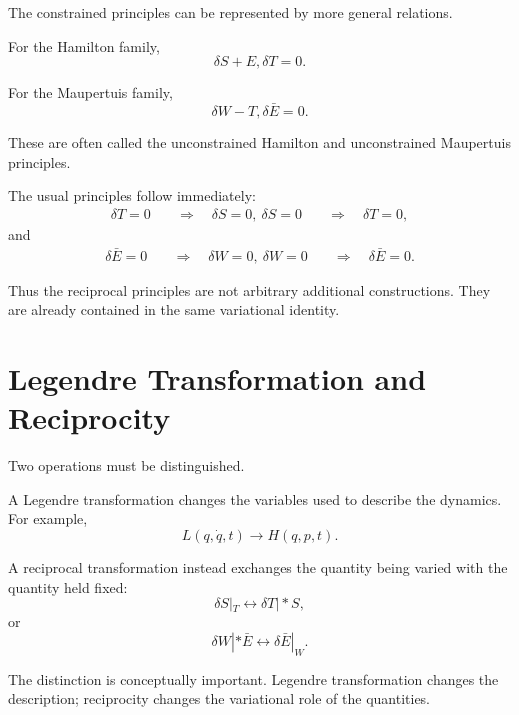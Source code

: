 The constrained principles can be represented by more general relations.

For the Hamilton family,
\begin{equation}
\boxed{
\delta S+E,\delta T=0.
}
\label{eq:UHP}
\end{equation}

For the Maupertuis family,
\begin{equation}
\boxed{
\delta W-T,\delta\bar E=0.
}
\label{eq:UMP}
\end{equation}

These are often called the unconstrained Hamilton and unconstrained Maupertuis principles.

The usual principles follow immediately:
\begin{align}
\delta T=0
&\quad\Rightarrow\quad
\delta S=0,
\
\delta S=0
&\quad\Rightarrow\quad
\delta T=0,
\end{align}
and
\begin{align}
\delta\bar E=0
&\quad\Rightarrow\quad
\delta W=0,
\
\delta W=0
&\quad\Rightarrow\quad
\delta\bar E=0.
\end{align}

Thus the reciprocal principles are not arbitrary additional constructions.  They are already contained in the same variational identity.

\section{Legendre Transformation and Reciprocity}

Two operations must be distinguished.

A Legendre transformation changes the variables used to describe the dynamics.  For example,
\begin{equation}
L(q,\dot q,t)
\longrightarrow
H(q,p,t).
\end{equation}

A reciprocal transformation instead exchanges the quantity being varied with the quantity held fixed:
\begin{equation}
\delta S|_T
\longleftrightarrow
\delta T|*S,
\end{equation}
or
\begin{equation}
\delta W|*{\bar E}
\longleftrightarrow
\delta\bar E|_W.
\end{equation}

The distinction is conceptually important.  Legendre transformation changes the description; reciprocity changes the variational role of the quantities.

